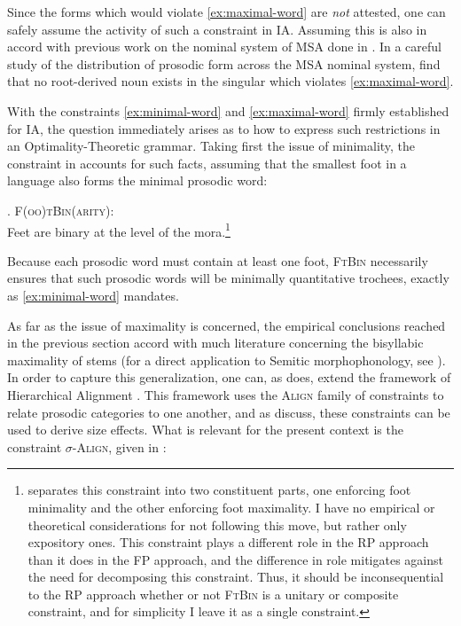 \documentclass[12pt,twoside,letterpaper]{article}
\begin{document}
Since the forms which would violate \ref{ex:maximal-word} are \emph{not} attested, one can safely assume the activity of such a constraint in IA. Assuming this is also in accord with previous work on the nominal system of MSA done in \cite{mccarthy90}. In a careful study of the distribution of prosodic form across the MSA nominal system, \cite{mccarthy90} find that no root-derived noun exists in the singular which violates \ref{ex:maximal-word}.

With the constraints \ref{ex:minimal-word} and \ref{ex:maximal-word} firmly established for IA, the question immediately arises as to how to express such restrictions in an Optimality-Theoretic grammar. Taking first the issue of minimality, the constraint in \Next accounts for such facts, assuming that the smallest foot in a language also forms the minimal prosodic word:

\ex. \textsc{F(oo)tBin(arity)}:\\Feet are binary at the level of the mora.\footnote{\cite[pp.217--9]{ussishkin00} separates this constraint into two constituent parts, one enforcing foot minimality and the other enforcing foot maximality. I have no empirical or theoretical considerations for not following this move, but rather only expository ones. This constraint plays a different role in the RP approach than it does in the FP approach, and the difference in role mitigates against the need for decomposing this constraint. Thus, it should be inconsequential to the RP approach whether or not \textsc{FtBin} is a unitary or composite constraint, and for simplicity I leave it as a single constraint.}

Because each prosodic word must contain at least one foot, \textsc{FtBin} necessarily ensures that such prosodic words will be minimally quantitative trochees, exactly as \ref{ex:minimal-word} mandates.

As far as the issue of maximality is concerned, the empirical conclusions reached in the previous section accord with much literature concerning the bisyllabic maximality of stems (for a direct application to Semitic morphophonology, see \cite{ussishkin05}). In order to capture this generalization, one can, as \cite[p. 188]{ussishkin05} does, extend the framework of Hierarchical Alignment \citep{ito96}. This framework uses the \textsc{Align} family of constraints to relate prosodic categories to one another, and as \cite{ito96,ussishkin00,ussishkin05} discuss, these constraints can be used to derive size effects. What is relevant for the present context is the constraint $\sigma$-\textsc{Align}, given in \Next:
\end{document}
